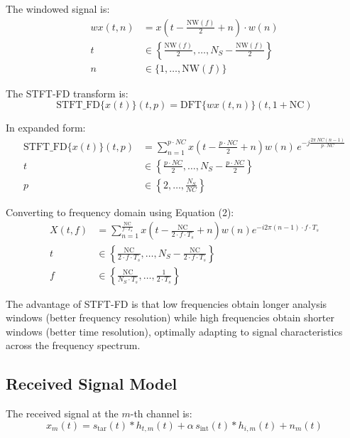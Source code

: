 \documentclass[journal]{IEEEtran}
\begin{document}
The windowed signal is:
\begin{equation}
\begin{aligned}
wx(t,n) &= x\left(t - \frac{\text{NW}(f)}{2} + n\right) \cdot w(n) \\
t &\in \left\{ \frac{\text{NW}(f)}{2}, \dots, N_S - \frac{\text{NW}(f)}{2} \right\} \\
n &\in \{1, \dots, \text{NW}(f)\}
\end{aligned}
\end{equation}

The STFT-FD transform is:
\begin{equation}
\text{STFT\_FD}\{x(t)\}(t, p) = \text{DFT}\{wx(t,n)\}(t, 1 + \text{NC})
\end{equation}

In expanded form:
{\small
\begin{equation}
\begin{split}
\text{STFT\_FD}\{x(t)\}(t,p)
&= \sum_{n=1}^{p \cdot NC}
x\!\left(t - \frac{p \cdot NC}{2} + n\right)
w(n)\, e^{-j \frac{2\pi \, NC (n-1)}{p \cdot NC}} \\
t &\in \left\{ \frac{p \cdot NC}{2}, \ldots, N_S - \frac{p \cdot NC}{2} \right\} \\
p &\in \left\{2, \ldots, \frac{N_S}{NC} \right\}
\end{split}
\label{eq:stftfd}
\end{equation}
}

Converting to frequency domain using Equation (2):
\begin{equation}
\begin{aligned}
X(t,f) &= \sum_{n=1}^{\frac{\text{NC}}{f \cdot T_s}} x\left(t - \frac{\text{NC}}{2 \cdot f \cdot T_s} + n\right) w(n) e^{-i2\pi (n-1) \cdot f \cdot T_s} \\
t &\in \left\{ \frac{\text{NC}}{2 \cdot f \cdot T_s}, \dots, N_S - \frac{\text{NC}}{2 \cdot f \cdot T_s} \right\} \\
f &\in \left\{ \frac{\text{NC}}{N_S \cdot T_s}, \dots, \frac{1}{2 \cdot T_s} \right\}
\end{aligned}
\end{equation}

The advantage of STFT-FD is that low frequencies obtain longer analysis windows (better frequency resolution) while high frequencies obtain shorter windows (better time resolution), optimally adapting to signal characteristics across the frequency spectrum.

\subsection{Received Signal Model}
The received signal at the $m$-th channel is:
\begin{equation}
x_{m}(t) = s_{\text{tar}}(t) \ast h_{t,m}(t) + \alpha \, s_{\text{int}}(t) \ast h_{i,m}(t) + n_m(t)
\end{equation}
\end{document}
